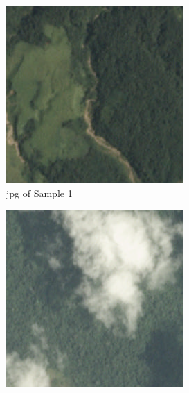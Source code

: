 \documentclass[10pt,twocolumn,letterpaper]{article}
\begin{document}
\begin{figure}
\begin{subfigure}{.5\columnwidth}
\includegraphics[width=0.9\columnwidth]{sample_images/train_1.jpg}
\caption{jpg of Sample 1}
\end{subfigure}%
\begin{subfigure}{.5\columnwidth}
\includegraphics[width=0.9\columnwidth]{sample_images/train_1000.jpg}

\end{subfigure}
\end{figure}
\end{document}
